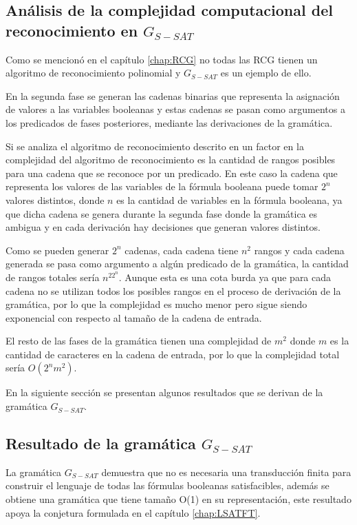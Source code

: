 \documentclass[12pt]{article}
\begin{document}
\subsection{Análisis de la complejidad computacional del reconocimiento en $G_{S-SAT}$}

Como se mencionó en el capítulo \ref{chap:RCG} no todas las RCG tienen un algoritmo de reconocimiento polinomial y $G_{S-SAT}$ es un ejemplo de ello.

En la segunda fase se generan las cadenas binarias que representa la asignación de valores a las variables 
booleanas y estas cadenas se pasan como argumentos a los predicados de fases posteriores, mediante las derivaciones de 
la gramática.

Si se analiza el algoritmo de reconocimiento descrito en \cite{mainRCGBib} un factor en la complejidad del 
algoritmo de reconocimiento es la cantidad de rangos posibles para una cadena que se reconoce por un predicado. 
En este caso la cadena que representa los valores de las variables de la fórmula booleana puede tomar $2^n$
valores distintos, donde $n$ es la cantidad de variables en la fórmula booleana, ya que dicha cadena se genera 
durante la segunda fase donde la gramática es ambigua y en cada derivación hay decisiones que generan valores 
distintos.

Como se pueden generar $2^n$ cadenas, cada cadena tiene $n^2$ rangos y cada cadena generada se pasa como 
argumento a algún predicado de la gramática, la cantidad de rangos totales sería $n^22^n$. 
Aunque esta es una cota burda ya que para cada cadena no se utilizan todos los posibles rangos en el proceso de derivación de la gramática, por lo que la complejidad es mucho menor pero sigue siendo exponencial con respecto al tamaño de la cadena de entrada.

El resto de las fases de la gramática tienen una complejidad de $m^2$ donde $m$
es la cantidad de caracteres en la cadena de entrada, por lo que la complejidad total sería $O(2^nm^2)$.

En la siguiente sección se presentan algunos resultados que se derivan de la gramática $G_{S-SAT}$.

\subsection{Resultado de la gramática $G_{S-SAT}$}

La gramática $G_{S-SAT}$ demuestra que no es necesaria una transducción finita para construir el lenguaje
de todas las fórmulas booleanas satisfacibles, además se obtiene una gramática que tiene tamaño O(1) en su representación,
este resultado apoya la conjetura formulada en el capítulo \ref{chap:LSATFT}.
\end{document}
